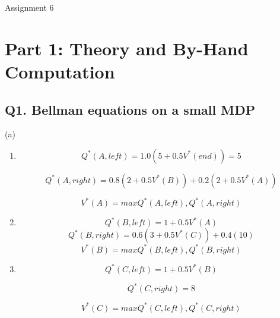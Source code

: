\documentclass{report}
\begin{document}
\thispagestyle{empty}
\begin{center} \LARGE Assignment 6 \end{center}

\section*{Part 1: Theory and By-Hand Computation}

\subsection*{Q1. Bellman equations on a small MDP}

(a)

\begin{enumerate}
    \item \begin{equation}
        Q^*(A,left)=1.0(5+0.5V^*(end))=5
    \end{equation}
    
    \begin{equation}
        Q^*(A,right)=0.8(2+0.5V^*(B))+0.2(2+0.5V^*(A))
    \end{equation}
    
    \begin{equation}
        V^*(A)=max{Q^*(A,left),Q^*(A,right)}
    \end{equation}
    \item 
    \begin{equation}
        Q^*(B,left)=1+0.5V^*(A)
    \end{equation}
    \begin{equation}
        Q^*(B,right)=0.6(3+0.5V^*(C))+0.4(10)
    \end{equation}
    \begin{equation}
        V^*(B)=max{Q^*(B,left),Q^*(B,right)}
    \end{equation}
    \item 
    \begin{equation}
        Q^*(C,left)=1+0.5V^*(B)
    \end{equation}  

    \begin{equation}
        Q^*(C,right)=8
    \end{equation}

    \begin{equation}
        V^*(C)=max{Q^*(C,left),Q^*(C,right)}
    \end{equation}

\end{enumerate}
\end{document}
